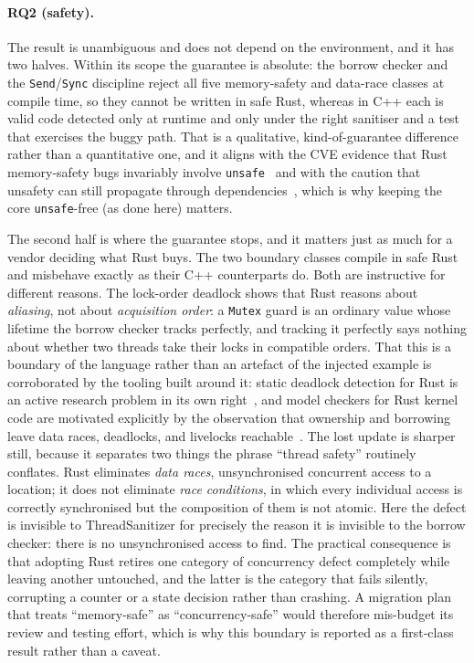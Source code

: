 \documentclass[english,twoside,openright,a4paper,censored,csm,software-track-2020]{HYthesisML}
\begin{document}
\paragraph{RQ2 (safety).} The result is unambiguous and does not depend on the environment,
and it has two halves. Within its scope the guarantee is absolute: the borrow checker and the
\texttt{Send}/\texttt{Sync} discipline reject all five memory-safety and data-race classes at
compile time, so they cannot be written in safe Rust, whereas in C++ each is valid code
detected only at runtime and only under the right sanitiser and a test that exercises the
buggy path. That is a qualitative, kind-of-guarantee difference rather than a quantitative
one, and it aligns with the CVE evidence that Rust memory-safety bugs invariably involve
\texttt{unsafe}~\cite{xu2021rustcve} and with the caution that unsafety can still propagate
through dependencies~\cite{evans2020rust}, which is why keeping the core \texttt{unsafe}-free
(as done here) matters.

The second half is where the guarantee stops, and it matters just as much for a vendor
deciding what Rust buys. The two boundary classes compile in safe Rust and misbehave exactly
as their C++ counterparts do. Both are instructive for different reasons. The lock-order
deadlock shows that Rust reasons about \emph{aliasing}, not about \emph{acquisition order}: a
\texttt{Mutex} guard is an ordinary value whose lifetime the borrow checker tracks perfectly,
and tracking it perfectly says nothing about whether two threads take their locks in
compatible orders. That this is a boundary of the language rather than an artefact of the
injected example is corroborated by the tooling built around it: static deadlock detection for
Rust is an active research problem in its own right~\cite{zhang2026deadlock}, and model
checkers for Rust kernel code are motivated explicitly by the observation that ownership and
borrowing leave data races, deadlocks, and livelocks
reachable~\cite{tang2025converos}. The lost update is sharper still, because it separates two things the
phrase ``thread safety'' routinely conflates. Rust eliminates \emph{data races}, unsynchronised
concurrent access to a location; it does not eliminate \emph{race conditions}, in which every
individual access is correctly synchronised but the composition of them is not atomic. Here
the defect is invisible to ThreadSanitizer for precisely the reason it is invisible to the
borrow checker: there is no unsynchronised access to find. The practical consequence is that
adopting Rust retires one category of concurrency defect completely while leaving another
untouched, and the latter is the category that fails silently, corrupting a counter or a state
decision rather than crashing. A migration plan that treats ``memory-safe'' as ``concurrency-safe''
would therefore mis-budget its review and testing effort, which is why this boundary is
reported as a first-class result rather than a caveat.
\end{document}
